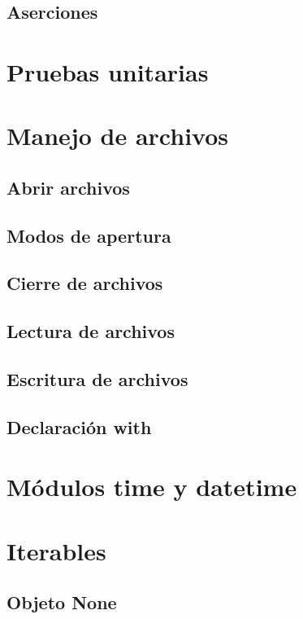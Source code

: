 \documentclass{article}
\begin{document}
\subsection{Aserciones}

\section{Pruebas unitarias}

\section{Manejo de archivos}

\subsection{Abrir archivos}

\subsection{Modos de apertura}

\subsection{Cierre de archivos}

\subsection{Lectura de archivos}

\subsection{Escritura de archivos}

\subsection{Declaración with}

\section{Módulos time y datetime}

\section{Iterables}

\subsection{Objeto None}
\end{document}
